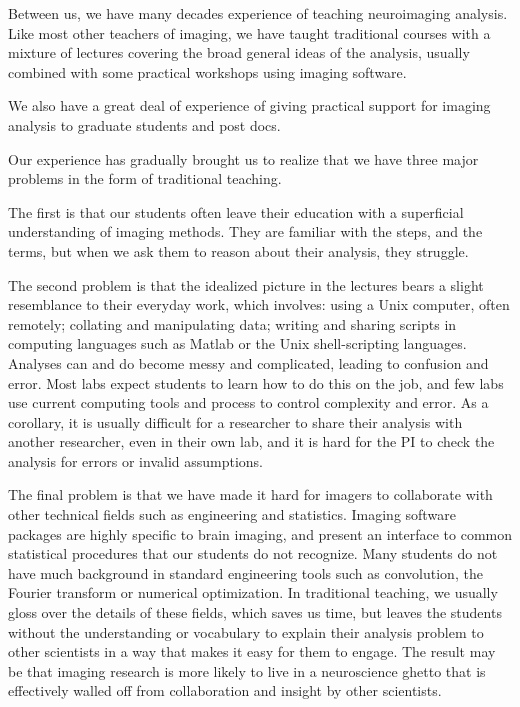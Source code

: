 Between us, we have many decades experience of teaching neuroimaging analysis.
Like most other teachers of imaging, we have taught traditional courses with a
mixture of lectures covering the broad general ideas of the analysis, usually
combined with some practical workshops using imaging software.

We also have a great deal of experience of giving practical support for
imaging analysis to graduate students and post docs.

Our experience has gradually brought us to realize that we have three major
problems in the form of traditional teaching.

The first is that our students often leave their education with a superficial
understanding of imaging methods.  They are familiar with the steps, and the
terms, but when we ask them to reason about their analysis, they struggle.

The second problem is that the idealized picture in the lectures bears a
slight resemblance to their everyday work, which involves: using a Unix
computer, often remotely; collating and manipulating data; writing and sharing
scripts in computing languages such as Matlab or the Unix shell-scripting
languages.  Analyses can and do become messy and complicated, leading to
confusion and error.  Most labs expect students to learn how to do this on the
job, and few labs use current computing tools and process to control 
complexity and error.  As a corollary, it is usually difficult for a
researcher to share their analysis with another researcher, even in their own
lab, and it is hard for the PI to check the analysis for errors or invalid
assumptions.

The final problem is that we have made it hard for imagers to collaborate with
other technical fields such as engineering and statistics.  Imaging software
packages are highly specific to brain imaging, and present an interface to
common statistical procedures that our students do not recognize.  Many
students do not have much background in standard engineering tools such as
convolution, the Fourier transform or numerical optimization.  In traditional
teaching, we usually gloss over the details of these fields, which saves us
time, but leaves the students without the understanding or vocabulary to
explain their analysis problem to other scientists in a way that makes it easy
for them to engage.  The result may be that imaging research is more likely to
live in a neuroscience ghetto that is effectively walled off from
collaboration and insight by other scientists.

